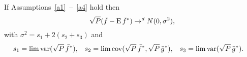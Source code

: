 If Assumptions~\ref{a1}~--~\ref{a4} hold then
\begin{equation*}
  \sqrt{P} (\bar{f} - \operatorname{E} \bar{f}^*) \to^d N(0, \sigma^2),
\end{equation*}
with $\sigma^2 = s_1 + 2(s_2 + s_3)$ and
\begin{align*}
    s_1  &= \lim \operatorname{var}(\sqrt{P}\, \bar{f}^*), &
    s_2  &= \lim \operatorname{cov}(\sqrt{P}\, \bar{f}^*, \sqrt{P}\, \bar{g}^*), &
    s_3  &= \lim \operatorname{var}(\sqrt{P}\, \bar{g}^*).
\end{align*}
